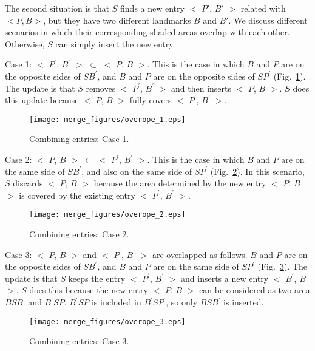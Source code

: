 \documentclass[3p,times]{elsarticle}
\begin{document}
The second situation is that  $S$ finds a new entry
$<$ $P'$, $B'$ $>$ related with $<P, B>$,
but they have two different landmarks $B$ and $B'$.
We discuss different scenarios in which their corresponding shaded areas overlap with each other.
Otherwise, $S$ can simply insert the new entry.





Case 1: $<$ $P^{'}$, $B^{'}$ $>$ $\subset$ $<$ $P$, $B$ $>$.
This is the case in which $B$ and $P$ are on the opposite sides of $SB^{'}$,
and $B$ and $P$ are on the opposite sides of $SP^{'}$ (Fig.~\ref{fig3_11}).
The update is that
$S$  removes $<$ $P^{'}$, $B^{'}$ $>$ and then
   inserts $<$ $P$, $B$ $>$.
$S$ does this update because $<$ $P$, $B$ $>$ fully covers $<$ $P^{'}$, $B^{'}$ $>$.


\begin{figure}[!htp]
\begin{center}
\texttt{[image: merge\_figures/overope\_1.eps]}
\end{center}
\caption{Combining entries: Case 1.}
\label{fig3_11}
\end{figure}


Case 2: $<$ $P$, $B$ $>$ $\subset$ $<$ $P^{'}$, $B^{'}$ $>$.
This is the case in which $B$ and $P$ are on the same side of $SB^{'}$,
and also on the same side of $SP^{'}$ (Fig.~\ref{fig3_12}).
In this scenario, $S$ discards $<$ $P$, $B$ $>$ because the area determined by the new entry $<$ $P$, $B$ $>$
is covered by the existing entry $<$ $P^{'}$, $B^{'}$ $>$.

\begin{figure}[!htp]
\begin{center}
\texttt{[image: merge\_figures/overope\_2.eps]}
\end{center}
\caption{Combining entries: Case 2.}
\label{fig3_12}
\end{figure}


Case 3: $<$ $P$, $B$ $>$ and $<$ $P^{'}$, $B^{'}$ $>$ are overlapped as follows. $B$ and $P$ are on the opposite sides of $SB^{'}$,
and $B$ and $P$ are on the same side of $SP^{'}$ (Fig.~\ref{fig3_13}).
The update is that
$S$ keeps the entry $<$ $P^{'}$, $B^{'}$ $>$ and inserts a new entry $<$ $B^{'}$, $B$ $>$. $S$ does this because
the new entry $<$ $P$, $B$ $>$ can be considered as two area $BSB^{'}$ and $B^{'}SP$. $B^{'}SP$ is included in $B^{'}SP^{'}$,
so only $BSB^{'}$ is inserted.


\begin{figure}[!htp]
\begin{center}
\texttt{[image: merge\_figures/overope\_3.eps]}
\end{center}
\caption{Combining entries: Case 3.}
\label{fig3_13}
\end{figure}
\end{document}
